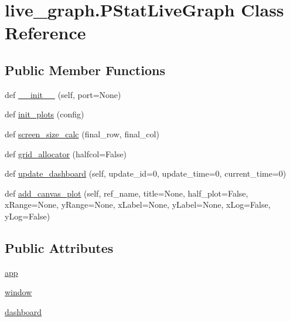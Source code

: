 \hypertarget{classlive__graph_1_1PStatLiveGraph}{}\section{live\+\_\+graph.\+P\+Stat\+Live\+Graph Class Reference}
\label{classlive__graph_1_1PStatLiveGraph}
\subsection*{Public Member Functions}
\begin{DoxyCompactItemize}
\item 
def \hyperlink{classlive__graph_1_1PStatLiveGraph_a210a499fd4e06392f8f5fffc209971a4}{\+\_\+\+\_\+init\+\_\+\+\_\+} (self, port=None)
\item 
def \hyperlink{classlive__graph_1_1PStatLiveGraph_a65b6193384abea9656044a84a6112eb2}{init\+\_\+plots} (config)
\item 
def \hyperlink{classlive__graph_1_1PStatLiveGraph_a7730f214090df612485e42ae758beb3e}{screen\+\_\+size\+\_\+calc} (final\+\_\+row, final\+\_\+col)
\item 
def \hyperlink{classlive__graph_1_1PStatLiveGraph_a4969c53cd50f31c9b50d86a7cac77a63}{grid\+\_\+allocator} (halfcol=False)
\item 
def \hyperlink{classlive__graph_1_1PStatLiveGraph_af167003562729fe08284e8f5675b26e2}{update\+\_\+dashboard} (self, update\+\_\+id=0, update\+\_\+time=0, current\+\_\+time=0)
\item 
def \hyperlink{classlive__graph_1_1PStatLiveGraph_abfe72ecd8755e0cc4870ecbd560d45c3}{add\+\_\+canvas\+\_\+plot} (self, ref\+\_\+name, title=None, half\+\_\+plot=False, x\+Range=None, y\+Range=None, x\+Label=None, y\+Label=None, x\+Log=False, y\+Log=False)
\end{DoxyCompactItemize}
\subsection*{Public Attributes}
\begin{DoxyCompactItemize}
\item 
\hyperlink{classlive__graph_1_1PStatLiveGraph_ad6b3c5024c9472884e04570fd1890f17}{app}
\item 
\hyperlink{classlive__graph_1_1PStatLiveGraph_a8cc1373f90af09e389d1da5a5b594492}{window}
\item 
\hyperlink{classlive__graph_1_1PStatLiveGraph_aff87cd16c9d35e895cd3d9657fade256}{dashboard}
\end{DoxyCompactItemize}


